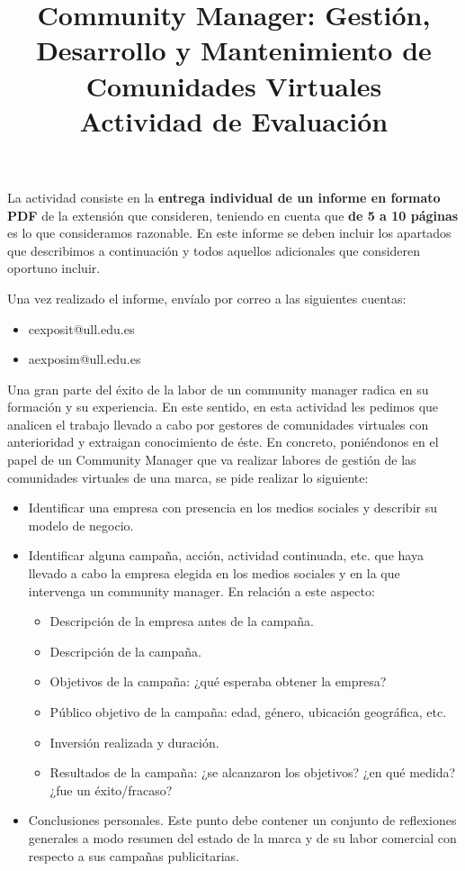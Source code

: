 \documentclass{article}
\title{
    Community Manager: Gestión, Desarrollo y Mantenimiento de Comunidades Virtuales \\
    \large Actividad de Evaluación}
\date{}
\begin{document}
\maketitle

La actividad consiste en la \textbf{entrega individual de un informe en formato PDF} de la extensión que consideren, teniendo en cuenta que \textbf{de 5 a 10 páginas} es lo que consideramos razonable. En este informe se deben incluir los apartados que describimos a continuación y todos aquellos adicionales que consideren oportuno incluir.

Una vez realizado el informe, envíalo por correo a las siguientes cuentas:
\begin{itemize}
    \item cexposit@ull.edu.es
    \item aexposim@ull.edu.es
\end{itemize}

Una gran parte del éxito de la labor de un community manager radica en su formación y su experiencia. En este sentido, en esta actividad les pedimos que analicen el trabajo llevado a cabo por gestores de comunidades virtuales con anterioridad y extraigan conocimiento de éste. En concreto, poniéndonos en el papel de un Community Manager que va realizar labores de gestión de las comunidades virtuales de una marca, se pide realizar lo siguiente: 
\begin{itemize}
    \item Identificar una empresa con presencia en los medios sociales y describir su modelo de negocio.
    \item Identificar alguna campaña, acción, actividad continuada, etc. que haya llevado a cabo la empresa elegida en los medios sociales y en la que intervenga un community manager. En relación a este aspecto:
    \begin{itemize}
        \item Descripción de la empresa antes de la campaña.
        \item Descripción de la campaña.
        \item Objetivos de la campaña: ¿qué esperaba obtener la empresa?
        \item Público objetivo de la campaña: edad, género, ubicación geográfica, etc. 
        \item Inversión realizada y duración.
        \item Resultados de la campaña: ¿se alcanzaron los objetivos? ¿en qué medida? ¿fue un éxito/fracaso? 
    \end{itemize}
    \item Conclusiones personales. Este punto debe contener un conjunto de reflexiones generales a modo resumen del estado de la marca y de su labor comercial con respecto a sus campañas publicitarias.
\end{itemize}
\end{document}

